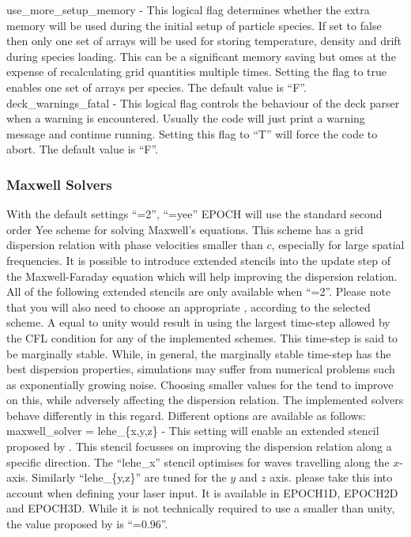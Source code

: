 {\emphtext use\_more\_setup\_memory} - This logical flag determines whether the
  extra memory will be used during the initial setup of particle species.
  If set to false then
  only one set of arrays will be used for storing temperature, density and
  drift during species loading. This can be a significant memory saving but
  omes at the expense of recalculating grid quantities multiple times.
  Setting the flag to true enables one set of arrays per species.
  The default value is ``F''.\\

{\emphtext deck\_warnings\_fatal} - This logical flag controls the behaviour
  of the deck parser when a warning is encountered. Usually the code will
  just print a warning message and continue running. Setting this flag to ``T''
  will force the code to abort.
  The default value is ``F''.\\


\subsubsection{Maxwell Solvers}
\label{sec:maxwell_solvers}
With the default settings ``=2'',
``=yee'' EPOCH will use the standard second order
Yee scheme for solving Maxwell's equations.
This scheme has a grid dispersion relation with phase velocities smaller than
$c$, especially for large spatial frequencies.
It is possible to introduce extended stencils into the update step of the
Maxwell-Faraday equation which will help improving the dispersion relation.
All of the following extended stencils are only available when
``=2''.
Please note that you will also need to choose an appropriate
, according to the selected scheme.
A  equal to unity would result in using the largest
time-step allowed by the CFL condition for any of the implemented schemes.
This time-step is said to be marginally stable.
While, in general, the marginally stable time-step has the best dispersion
properties, simulations may suffer from numerical problems such as
exponentially growing noise.
Choosing smaller values for the  tend to improve on
this, while adversely affecting the dispersion relation.
The implemented solvers behave differently in this regard.
Different options are available as follows:\\

{\emphtext maxwell\_solver = lehe\_\{x,y,z\}} - This setting will enable an
extended
stencil proposed by \citet{Lehe2013}.
This stencil focusses on improving the dispersion relation along a specific
direction. The ``lehe\_x'' stencil optimises for waves travelling along the
$x$-axis. Similarly ``lehe\_\{y,z\}'' are tuned for the $y$ and $z$ axis.
please take this into account when defining your laser input.
It is available in EPOCH1D, EPOCH2D and EPOCH3D.
While it is not technically required to use a 
smaller than unity, the value proposed by \citet{Lehe2013} is
``=0.96''. \\

